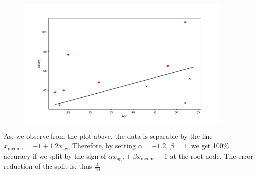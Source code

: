 \begin{answer}
\begin{figure}[H]
    \centering
    \includegraphics[width=10.5cm]{decision_trees_general/check.png}
\end{figure}
As, we observe from the plot above, the data is separable by the line 
$x_{\text{income}} = -1 + 1.2x_{\text{age}}$
Therefore, by setting $\alpha=-1.2$, $\beta=1$, we get 100\% accuracy if we split by the sign of $\alpha x_{\text{age}} +\beta x_{\text{income}} -1$ at the root node. The error reduction of the split is, thus $\frac{4}{10}$
\end{answer}